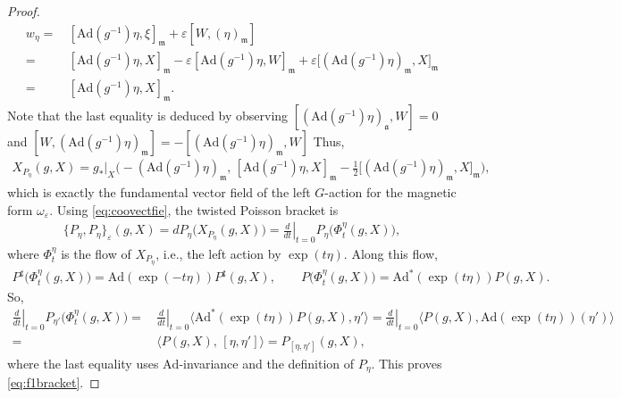 \documentclass[11pt]{amsart}
\theoremstyle{definition}
\theoremstyle{plain}
\theoremstyle{conclusion}
\begin{document}
\begin{proof}
\begin{align*}
w_\eta= & \, [\mathrm{Ad}(g^{-1})\eta,\xi]_{\mathfrak{m}} + \varepsilon[W,(\eta)_{\mathfrak{m}}] \\
= & \, [\mathrm{Ad}(g^{-1})\eta,X]_{\mathfrak{m}}-\varepsilon [\mathrm{Ad}(g^{-1})\eta,W]_\mathfrak{m} +  \varepsilon \big[(\mathrm{Ad}(g^{-1})\eta)_{\mathfrak{m}},X\big]_{\mathfrak{m}}  \\
= & \, [\mathrm{Ad}(g^{-1})\eta,X]_\mathfrak{m}.
\end{align*} Note that the last equality is deduced by observing $[\left(\mathrm{Ad}(g^{-1})\eta\right)_\mathfrak{a},W] = 0 $ and $[W,\left(\mathrm{Ad}(g^{-1})\eta\right)_\mathfrak{m}] = -[\left(\mathrm{Ad}(g^{-1})\eta\right)_\mathfrak{m},W]  $ Thus, \begin{align}
X_{P_\eta}(g,X) = g_*\vert_X\Big(-(\mathrm{Ad}(g^{-1})\eta)_{\mathfrak{m}},\, [\mathrm{Ad}(g^{-1})\eta,X]_{\mathfrak{m}}-\frac{1}{2}\big[(\mathrm{Ad}(g^{-1})\eta)_{\mathfrak{m}},X\big]_{\mathfrak{m}}\Big),\label{eq:coovectfie}
\end{align}
which is exactly the fundamental vector field of the left $G$-action for the magnetic form $\omega_\varepsilon$.  Using \eqref{eq:coovectfie}, the twisted Poisson bracket is \begin{align*}
\{P_\eta,P_\eta\}_\varepsilon(g,X)= dP_\eta \big(X_{P_\eta}(g,X)\big)= \left.\frac{d}{dt}\right\vert_{t=0} P_\eta \big(\Phi^{\eta}_t(g,X)\big),
\end{align*}
where $\Phi^{\eta}_t$ is the flow of $X_{P_\eta}$, i.e., the left action by $\exp(t\eta)$. Along this flow,
\begin{align*}
P^\sharp\bigl(\Phi_t^\eta(g,X)\bigr)=\mathrm{Ad}(\exp(-t\eta))P^\sharp(g,X),
\qquad
P\bigl(\Phi_t^\eta(g,X)\bigr)=\mathrm{Ad}^*(\exp(t\eta))P(g,X).
\end{align*} So,
\begin{align*}
\left.\frac{d}{dt}\right\vert_{t=0}P_{\eta'}\bigl(\Phi_t^\eta(g,X)\bigr)
=& \, \left.\frac{d}{dt}\right\vert_{t=0}\langle \mathrm{Ad}^*(\exp(t\eta))P(g,X),\eta'\rangle = \left.\frac{d}{dt}\right\vert_{t=0}\langle P(g,X),\mathrm{Ad}(\exp(t\eta))(\eta')\rangle\\
= & \,  \langle P(g,X),\,[\eta,\eta'] \rangle
=  P_{[\eta,\eta']}(g,X),
\end{align*}
where the last equality uses $\mathrm{Ad}$-invariance and the definition of $P_\eta$. This proves \eqref{eq:f1bracket}.   
\end{proof}
\end{document}
